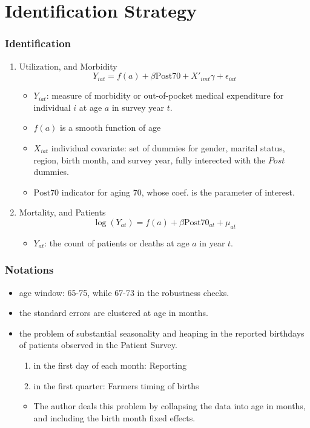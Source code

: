 \documentclass[dvipdfmx,11pt]{beamer}
\begin{document}
\section{Identification Strategy}
\begin{frame}\frametitle{Identification}
  \begin{enumerate}
    \item Utilization, and Morbidity
    \[
    Y_{iat} = f(a) + \beta \text{Post70} + X'_{imt} \gamma + \epsilon_{iat}
    \]
    \begin{itemize}
      \item $Y_{iat}$: measure of morbidity or out-of-pocket medical expenditure for individual $i$ at age $a$ in survey year $t$.
      \item $f(a)$ is a smooth function of age
      \item $X_{iat}$ individual covariate: set of dummies for gender, marital status, region, birth month, and survey year, fully interected with the $Post$ dummies.
      \item $\text{Post70}$ indicator for aging 70, whose coef. is the parameter of interest.
    \end{itemize}
    \item Mortality, and Patients
    \[
    \log(Y_{at}) = f(a) + \beta \text{Post}70_{at} + \mu_{at}
    \]
    \begin{itemize}
      \item $Y_{at}$: the count of patients or deaths at age $a$ in year $t$.
    \end{itemize}
  \end{enumerate}
\end{frame}

\begin{frame}\frametitle{Notations}
  \begin{itemize}
    \item age window: 65-75, while 67-73 in the robustness checks.
    \item the standard errors are clustered at age in months.
    \item the problem of substantial seasonality and heaping in the reported birthdays of patients observed in the Patient Survey.
    \begin{enumerate}
      \item in the first day of each month: Reporting
      \item in the first quarter: Farmers timing of births
    \end{enumerate}
    \begin{itemize}
      \item The author deals this problem by collapsing the data into age in months, and including the birth month fixed effects.
    \end{itemize}
  \end{itemize}
\end{frame}
\end{document}
